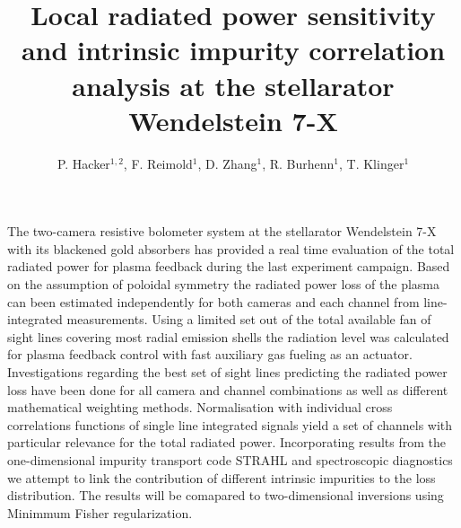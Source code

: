 \documentclass{epsconf}
\title{%
    Local radiated power sensitivity and intrinsic impurity correlation
    analysis at the stellarator Wendelstein 7-X}%
\author{%
    P. Hacker$^{1,2}$, %
    F. Reimold$^{1}$, %
    D. Zhang$^{1}$, %
    R. Burhenn$^{1}$, %
    T. Klinger$^{1}$%
}%
\institute{
    $^{1}$ Max-Planck Institute for Plasma Physics, Greifswald, Germany\\%
    $^{2}$ Universität Greifswald, %
    D-17491 Greifswald, Germany%
}%
\begin{document}
\maketitle

The two-camera resistive bolometer system at the stellarator Wendelstein 7-X with its blackened gold absorbers has provided a real time evaluation of the total radiated power for plasma feedback during the last experiment campaign. Based on the assumption of poloidal symmetry the radiated power loss of the plasma can been estimated independently for both cameras and each channel from line-integrated measurements. Using a limited set out of the total available fan of sight lines covering most radial emission shells the radiation level was calculated for plasma feedback control with fast auxiliary gas fueling as an actuator. Investigations regarding the best set of sight lines predicting the radiated power loss have been done for all camera and channel combinations as well as different mathematical weighting methods. Normalisation with individual cross correlations functions of single line integrated signals yield a set of channels with particular relevance for the total radiated power. Incorporating results from the one-dimensional impurity transport code STRAHL and spectroscopic diagnostics we attempt to link the contribution of different intrinsic impurities to the loss distribution. The results will be comapared to two-dimensional inversions using Minimmum Fisher regularization.
\end{document}
